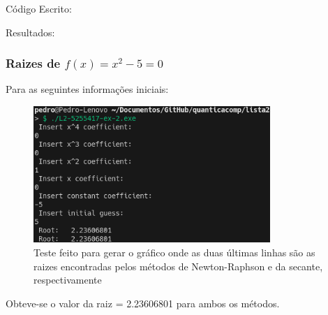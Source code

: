 \documentclass[12pt, a4paper]{article} %
\begin{document}
        C\'odigo Escrito:
        

        Resultados:

        \subsubsection{Raizes de $f(x) = x^2 - 5 = 0$}

            Para as seguintes informa\c{c}\~oes iniciais:
            \begin{figure}[H]
                \centering
                \includegraphics[width=0.8\textwidth]{../images/results-ex-2-5.png}
                \caption{Teste feito para gerar o gr\'afico onde as duas \'ultimas linhas s\~ao as raizes encontradas pelos m\'etodos de Newton-Raphson e da secante, respectivamente}
            \end{figure}
            Obteve-se o valor da raiz = 2.23606801 para ambos os m\'etodos.
\end{document}
